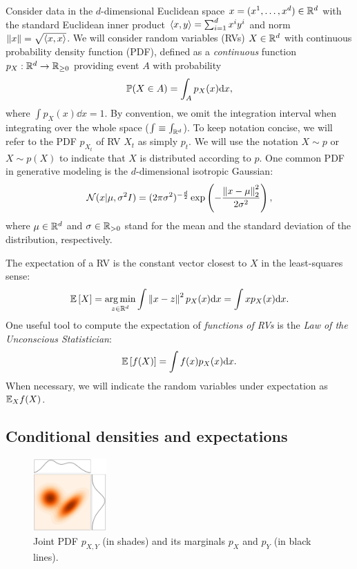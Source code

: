 \documentclass{fairmeta}
\numberwithin{equation}{section}
\begin{document}
Consider data in the $d$-dimensional Euclidean space $x=(x^1,\ldots,x^d)\in \mathbb R^d$ with the standard Euclidean inner product $\left \langle x,y \right \rangle=\sum_{i=1}^d x^i y^i$ and norm $\left\Vert x\right\Vert=\sqrt{\left \langle x,x \right \rangle}$.
We will consider random variables (RVs) $X\in\mathbb{R}^d$ with continuous probability density function (PDF), defined as a \emph{continuous} function $p_X:\mathbb R^d\rightarrow \mathbb R_{\geq 0}$ providing event $A$ with probability
\begin{equation}
    {\mathbb{P}}(X\in A) = \int_A p_X(x) \mathrm{d} x,
\end{equation}
where $\int p_X(x)\dd x = 1$.
By convention, we omit the integration interval when integrating over the whole space ($\int \equiv \int_{\mathbb R^d}$).
To keep notation concise, we will refer to the PDF $p_{X_t}$ of RV $X_t$ as simply $p_t$.
We will use the notation $X \sim p$ or $X \sim p(X)$ to indicate that $X$ is distributed according to $p$.
One common PDF in generative modeling is the $d$-dimensional isotropic Gaussian:
\begin{equation}\label{e:gaussian}
  {\mathcal{N}}(x|\mu,\sigma^2 I) = (2\pi\sigma^2)^{-\frac{d}{2}}\exp\left(-\frac{\left\Vert x-\mu\right\Vert_2^2}{2\sigma^2}\right),
\end{equation}
where $\mu\in \mathbb R^d$ and $\sigma \in \mathbb R_{>0}$ stand for the mean and the standard deviation of the distribution, respectively.


The expectation of a RV is the constant vector closest to $X$ in the least-squares sense:
\begin{equation}\label{e:E}
    \E\brac{X}=\argmin_{z\in\Real^d} \int \norm{x-z}^2 p_X(x)\dd x = \int x p_X(x)\dd x. %
\end{equation}
One useful tool to compute the expectation of \emph{functions of RVs} is the \emph{Law of the Unconscious Statistician}:
\begin{equation}\label{e:law_of_uncon_stat}
    \E \brac{f(X)} = \int f(x) p_X(x) \dd x. %
\end{equation}
When necessary, we will indicate the random variables under expectation as $\mathbb{E}_{X} f(X)$.



\subsection{Conditional densities and expectations} \label{sec:conditional_densities_and_expectations}
\begin{figure}
  \vspace{-40pt}
  \begin{center}
    \includegraphics[width=0.25\textwidth]{assets/joints.png}
  \end{center}
  \caption{Joint PDF $p_{X,Y}$ (in shades) and its marginals $p_X$ and $p_Y$ (in black lines).}
  \label{fig:joint}
\end{figure}
\end{document}
